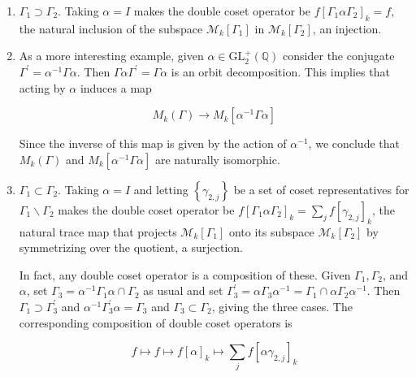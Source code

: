 \begin{example}
    \begin{enumerate}
        \item $\Gamma_{1} \supset \Gamma_{2}$. Taking $\alpha=I$ makes the double coset operator be $f\left[\Gamma_{1} \alpha \Gamma_{2}\right]_{k}=f$, the natural inclusion of the subspace $\mathcal{M}_{k}\left[\Gamma_{1}\right]$ in $\mathcal{M}_{k}\left[\Gamma_{2}\right]$, an injection.
\item As a more interesting example, given $\alpha \in \mathrm{GL}_{2}^{+}(\mathbb{Q})$ consider the conjugate $\Gamma^{\prime}=\alpha^{-1} \Gamma \alpha$. Then $\Gamma \alpha \Gamma^{\prime}=\Gamma \alpha$ is an orbit decomposition. This implies that acting by $\alpha$ induces a map

$$
M_{k}(\Gamma) \rightarrow M_{k}\left[\alpha^{-1} \Gamma \alpha\right]
$$

Since the inverse of this map is given by the action of $\alpha^{-1}$, we conclude that $M_{k}(\Gamma)$ and $M_{k}\left[\alpha^{-1} \Gamma \alpha\right]$ are naturally isomorphic.
\item $\Gamma_{1} \subset \Gamma_{2}$. Taking $\alpha=I$ and letting $\left\{\gamma_{2, j}\right\}$ be a set of coset representatives for $\Gamma_{1} \backslash \Gamma_{2}$ makes the double coset operator be $f\left[\Gamma_{1} \alpha \Gamma_{2}\right]_{k}=\sum_{j} f\left[\gamma_{2, j}\right]_{k}$, the natural trace map that projects $\mathcal{M}_{k}\left[\Gamma_{1}\right]$ onto its subspace $\mathcal{M}_{k}\left[\Gamma_{2}\right]$ by symmetrizing over the quotient, a surjection.

In fact, any double coset operator is a composition of these. Given $\Gamma_{1}, \Gamma_{2}$, and $\alpha$, set $\Gamma_{3}=\alpha^{-1} \Gamma_{1} \alpha \cap \Gamma_{2}$ as usual and set $\Gamma_{3}^{\prime}=\alpha \Gamma_{3} \alpha^{-1}=\Gamma_{1} \cap \alpha \Gamma_{2} \alpha^{-1}$. Then $\Gamma_{1} \supset \Gamma_{3}^{\prime}$ and $\alpha^{-1} \Gamma_{3}^{\prime} \alpha=\Gamma_{3}$ and $\Gamma_{3} \subset \Gamma_{2}$, giving the three cases. The corresponding composition of double coset operators is

$$
f \mapsto f \mapsto f[\alpha]_{k} \mapsto \sum_{j} f\left[\alpha \gamma_{2, j}\right]_{k}
$$

    \end{enumerate}
\end{example}

